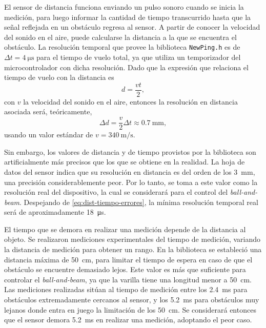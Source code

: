 El sensor de distancia funciona enviando un pulso sonoro cuando se inicia la medición, para luego informar la cantidad de tiempo transcurrido hasta que la señal reflejada en un obstáculo regresa al sensor. A partir de conocer la velocidad del sonido en el aire, puede calcularse la distancia a la que se encuentra el obstáculo. La resolución temporal que provee la biblioteca \verb|NewPing.h| es de $\Delta t = \qty{4}{\us}$ para el tiempo de vuelo total, ya que utiliza un temporizador del microcontrolador con dicha resolución. Dado que la expresión que relaciona el tiempo de vuelo con la distancia es
\begin{equation*}
    d = \frac{v t}{2},
\end{equation*}
con $v$ la velocidad del sonido en el aire, entonces la resolución en distancia asociada será, teóricamente,
\begin{equation}
    \label{eq:dist-tiempo-errores}
    \Delta d = \frac{v}{2} \Delta t \approx \qty{0.7}{\mm},
\end{equation}
usando un valor estándar de $v = \qty{340}{\m\per\s}$.

Sin embargo, los valores de distancia y de tiempo provistos por la biblioteca son artificialmente más precisos que los que se obtiene en la realidad. La hoja de datos del sensor indica que su resolución en distancia es del orden de los \qty{3}{\mm}, una precisión considerablemente peor. Por lo tanto, se toma a este valor como la resolución real del dispositivo, la cual se considerará para el control del \emph{ball-and-beam}. Despejando de \eqref{eq:dist-tiempo-errores}, la mínima resolución temporal real será de aproximadamente \qty{18}{\us}.

El tiempo que se demora en realizar una medición depende de la distancia al objeto. Se realizaron mediciones experimentales del tiempo de medición, variando la distancia de medición para obtener un rango. En la biblioteca se estableció una distancia máxima de \qty{50}{\cm}, para limitar el tiempo de espera en caso de que el obstáculo se encuentre demasiado lejos. Este valor es más que suficiente para controlar el \emph{ball-and-beam}, ya que la varilla tiene una longitud menor a \qty{50}{\cm}. Las mediciones realizadas sitúan al tiempo de medición entre los \qty{2.4}{\ms} para obstáculos extremadamente cercanos al sensor, y los \qty{5.2}{\ms} para obstáculos muy lejanos donde entra en juego la limitación de los \qty{50}{\cm}. Se considerará entonces que el sensor demora \qty{5.2}{\ms} en realizar una medición, adoptando el peor caso.

